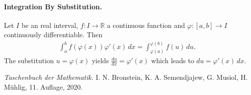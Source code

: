 \documentclass[a4paper,11pt]{article}
\begin{document}
\paragraph{Integration By Substitution.} Let $I$ be an real interval, $f: I \rightarrow \mathbb{R}$ a continuous function and $\varphi: [a,b] \rightarrow I$ continuously differentiable. Then
\begin{gather*}
    \int _{a}^{b}f(\varphi (x))\varphi '(x)\,dx=\int _{\varphi (a)}^{\varphi (b)}f(u)\,du.
\end{gather*}
The substitution $u = \varphi(x)$ yields ${\frac {du}{dx}}=\varphi '(x)$ which leads to $du=\varphi '(x) \,dx$.





\begin{thebibliography}{9}
     \emph{Taschenbuch der Mathematik.}
    I. N. Bronstein, K. A. Semendjajew, G. Musiol, H. Mühlig, 11. Auflage, 2020.
\end{thebibliography}
\end{document}
